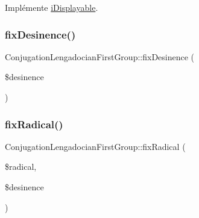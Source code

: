 Implémente \hyperlink{interfacei_displayable_a0264fd455c876e897f754cf85f1681ca}{i\+Displayable}.

\hypertarget{class_conjugation_lengadocian_first_group_a7e9cdca67d8ed30db1ef7547c61f38da}{}\label{class_conjugation_lengadocian_first_group_a7e9cdca67d8ed30db1ef7547c61f38da} 
\subsubsection{\texorpdfstring{fix\+Desinence()}{fixDesinence()}}
{\footnotesize\ttfamily Conjugation\+Lengadocian\+First\+Group\+::fix\+Desinence (\begin{DoxyParamCaption}\item[{}]{\$desinence }\end{DoxyParamCaption})\hspace{0.3cm}{\ttfamily [protected]}}

\hypertarget{class_conjugation_lengadocian_first_group_ac9e14d59dc07f35e204efa14bd00d903}{}\label{class_conjugation_lengadocian_first_group_ac9e14d59dc07f35e204efa14bd00d903} 
\subsubsection{\texorpdfstring{fix\+Radical()}{fixRadical()}}
{\footnotesize\ttfamily Conjugation\+Lengadocian\+First\+Group\+::fix\+Radical (\begin{DoxyParamCaption}\item[{}]{\$radical,  }\item[{}]{\$desinence }\end{DoxyParamCaption})\hspace{0.3cm}{\ttfamily [protected]}}

\hypertarget{class_conjugation_lengadocian_first_group_a99becd6debfe143a6577f1ba7b063d58}{}\label{class_conjugation_lengadocian_first_group_a99becd6debfe143a6577f1ba7b063d58} 
